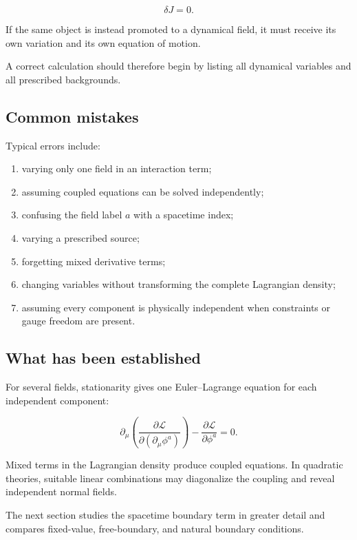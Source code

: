 \[
\delta J=0.
\]

If the same object is instead promoted to a dynamical field, it must receive its own variation and its own equation of motion.

A correct calculation should therefore begin by listing all dynamical variables and all prescribed backgrounds.

\subsection{Common mistakes}

Typical errors include:

\begin{enumerate}
    \item varying only one field in an interaction term;
    \item assuming coupled equations can be solved independently;
    \item confusing the field label \(a\) with a spacetime index;
    \item varying a prescribed source;
    \item forgetting mixed derivative terms;
    \item changing variables without transforming the complete Lagrangian density;
    \item assuming every component is physically independent when constraints or gauge freedom are present.
\end{enumerate}

\subsection{What has been established}

For several fields, stationarity gives one Euler--Lagrange equation for each independent component:

\[
\partial_{\mu}
\left(
\frac{\partial\mathcal{L}}
{\partial(\partial_{\mu}\phi^{a})}
\right)
-
\frac{\partial\mathcal{L}}{\partial\phi^{a}}
=0.
\]

Mixed terms in the Lagrangian density produce coupled equations. In quadratic theories, suitable linear combinations may diagonalize the coupling and reveal independent normal fields.

The next section studies the spacetime boundary term in greater detail and compares fixed-value, free-boundary, and natural boundary conditions.